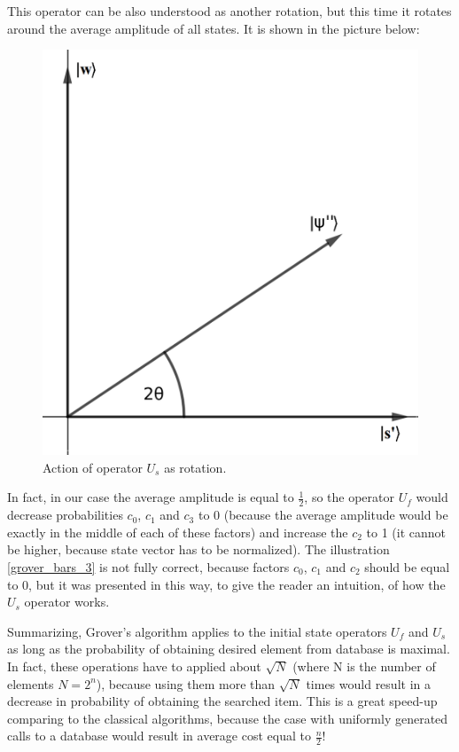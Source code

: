 This operator can be also understood as another rotation, but this time it rotates around the average amplitude of all states. It is shown in the picture below:

\begin{figure}[ht]
\centering
\includegraphics[scale=0.2]{grover_3.png}
\caption{Action of operator $U_s$ as rotation.}
\end{figure}

\begin{remark}
In fact, in our case the average amplitude is equal to $\frac{1}{2}$, so the operator $U_f$ would decrease probabilities $c_0$, $c_1$ and $c_3$ to 0 (because the average amplitude would be exactly in the middle of each of these factors) and increase the $c_2$ to 1 (it cannot be higher, because state vector has to be normalized). The illustration \ref{grover_bars_3} is not fully correct, because factors $c_0$, $c_1$ and $c_2$ should be equal to 0, but it was presented in this way, to give the reader an intuition, of how the $U_s$ operator works.
\end{remark}

Summarizing, Grover's algorithm applies to the initial state operators $U_f$ and $U_s$ as long as the probability of obtaining desired element from database is maximal. In fact, these operations have to applied about $\sqrt{N}$ (where N is the number of elements $N = 2^n$), because using them more than $\sqrt{N}$ times would result in a decrease in probability of obtaining the searched item. This is a great speed-up comparing to the classical algorithms, because the case with uniformly generated calls to a database would result in average cost equal to $\frac{n}{2}$!

